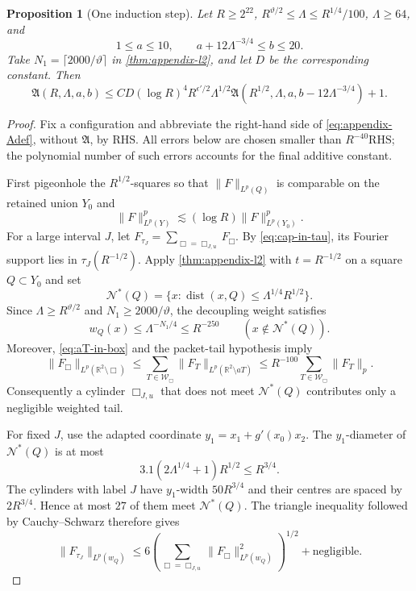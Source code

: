 \documentclass[11pt,letterpaper]{amsart}
\newtheorem{proposition}[proposition]{Proposition}
\newcommand{\dist}{\operatorname{dist}}
\begin{document}
\begin{proposition}[One induction step]
\label{prop:appendix-one-step}
Let $R\ge2^{22}$,
$R^{\vartheta/2}\le\Lambda\le R^{1/4}/100$, $\Lambda\ge64$, and
\[
 1\le a\le10,
 \qquad a+12\Lambda^{-3/4}\le b\le20.
\]
Take $N_1=\lceil2000/\vartheta\rceil$ in
\cref{thm:appendix-l2}, and let $D$ be the corresponding constant.  Then
\begin{equation}\label{eq:appendix-recurrence}
 \mathfrak A(R,\Lambda,a,b)
 \le C D(\log R)^4R^{\epsilon'/2}\Lambda^{1/2}
 \mathfrak A(R^{1/2},\Lambda,a,b-12\Lambda^{-3/4})+1.
\end{equation}
\end{proposition}

\begin{proof}
Fix a configuration and abbreviate the right-hand side of
\eqref{eq:appendix-Adef}, without $\mathfrak A$, by $\mathrm{RHS}$.  All
errors below are chosen smaller than $R^{-40}\mathrm{RHS}$; the polynomial
number of such errors accounts for the final additive constant.

First pigeonhole the $R^{1/2}$-squares so that
$\|F\|_{L^p(Q)}$ is comparable on the retained union $Y_0$ and
\begin{equation}\label{eq:appendix-square-pigeonhole}
 \|F\|_{L^p(Y)}^p\lesssim(\log R)\|F\|_{L^p(Y_0)}^p.
\end{equation}
For a large interval $J$, let
$F_{\tau_J}=\sum_{\Box=\Box_{J,u}}F_\Box$.  By
\eqref{eq:cap-in-tau}, its Fourier support lies in
$\tau_J(R^{-1/2})$.  Apply \cref{thm:appendix-l2} with $t=R^{-1/2}$ on a
square $Q\subset Y_0$ and set
\[
 \mathcal N^*(Q)
 =\{x:\dist(x,Q)\le\Lambda^{1/4}R^{1/2}\}.
\]
Since $\Lambda\ge R^{\vartheta/2}$ and
$N_1\ge2000/\vartheta$, the decoupling weight satisfies
\[
 w_Q(x)\le \Lambda^{-N_1/4}\le R^{-250}
 \qquad(x\notin\mathcal N^*(Q)).
\]
Moreover, \eqref{eq:aT-in-box} and the packet-tail hypothesis imply
\[
 \|F_\Box\|_{L^p(\mathbb R^2\setminus\Box)}
 \le \sum_{T\in\mathcal W_\Box}
       \|F_T\|_{L^p(\mathbb R^2\setminus aT)}
 \le R^{-100}\sum_{T\in\mathcal W_\Box}\|F_T\|_p.
\]
Consequently a cylinder $\Box_{J,u}$ that does not meet
$\mathcal N^*(Q)$ contributes only a negligible weighted tail.

For fixed $J$, use the adapted coordinate
$y_1=x_1+g'(x_0)x_2$.  The $y_1$-diameter of
$\mathcal N^*(Q)$ is at most
\[
 3.1(2\Lambda^{1/4}+1)R^{1/2}\le R^{3/4}.
\]
The cylinders with label $J$ have $y_1$-width $50R^{3/4}$ and their
centres are spaced by $2R^{3/4}$.  Hence at most $27$ of them meet
$\mathcal N^*(Q)$.  The triangle inequality followed by Cauchy--Schwarz
therefore gives
\[
 \|F_{\tau_J}\|_{L^p(w_Q)}
 \le 6\left(\sum_{\Box=\Box_{J,u}}
          \|F_\Box\|_{L^p(w_Q)}^2\right)^{1/2}
 +\text{negligible}.
\]


\end{proof}
\end{document}
